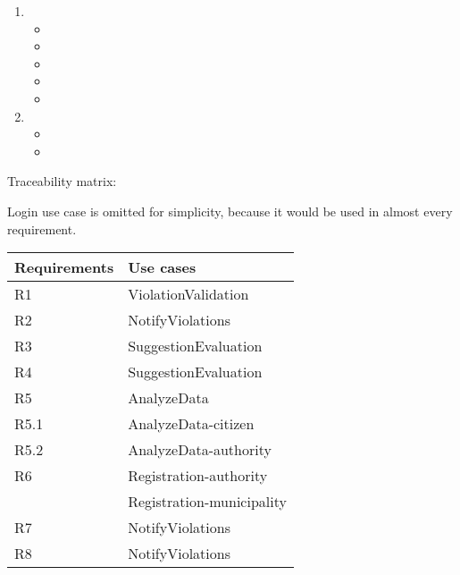 \begin{enumerate}[label={}]
	\item {}
	\begin{itemize}[label={}]
		\item {}
		\item {}
		\item {}
		\item {}
		\item {}
	\end{itemize}
	\item {}
	\begin{itemize}[label={}]
		\item {}
		\item {}
	\end{itemize} 
\end{enumerate}

\bigskip
Traceability matrix:


Login use case is omitted for simplicity, because it would be used in almost every requirement.


\begin{tabular}{|l|>{\raggedright\arraybackslash}p{8cm}|}
	\hline 
	Requirements & Use cases \\ 
	\hline 
	R1 &  ViolationValidation \\ 
	\hline 
	R2 &  NotifyViolations \\ 
	\hline 
	R3 &  SuggestionEvaluation \\ 
	\hline 
	R4 &  SuggestionEvaluation \\ 
	\hline 
	R5 & AnalyzeData \\ 
	\hline 
	R5.1& AnalyzeData-citizen \\ 
	\hline 
	R5.2& AnalyzeData-authority \\ 
	\hline 
	R6 & Registration-authority \\ 
	   & Registration-municipality \\
	\hline 
	R7 & NotifyViolations \\ 
	\hline 
	R8 & NotifyViolations \\ 
	\hline 
\end{tabular} 
